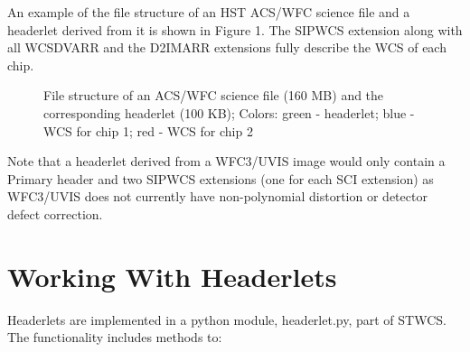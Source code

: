 An example of the file structure of an HST ACS/WFC science file and a headerlet derived from it is shown in Figure 1. The SIPWCS extension along with all WCSDVARR and the D2IMARR extensions fully describe the WCS of each chip.

\begin{figure}[!h]
\caption{File structure of an ACS/WFC science file (160 MB) and the corresponding headerlet (100 KB); Colors: green - headerlet; blue - WCS for chip 1; red - WCS for chip 2}
\end{figure}

Note that a headerlet derived from a WFC3/UVIS image would only contain a Primary header and two SIPWCS extensions (one for each SCI extension) as WFC3/UVIS does not currently have non-polynomial distortion or detector defect correction.

\section{Working With Headerlets}
Headerlets are implemented in a python module, headerlet.py, part of STWCS. The functionality includes methods to:

